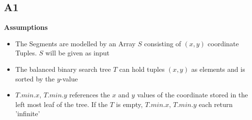\subsection*{A1}











\textbf{Assumptions}

\begin{itemize}
    \item The Segments are modelled by an Array $S$ consisting of $(x,y)$ coordinate Tuples. $S$ will be given as input
    \item The balanced binary search tree $T$ can hold tuples $(x,y)$ as elements and is sorted by the $y$-value
    \item $T.min.x$, $T.min.y$ references the $x$ and $y$ values of the coordinate stored in the left most leaf of the tree.
          If the $T$ is empty, $T.min.x$, $T.min.y$ each return 'infinite'
\end{itemize}

